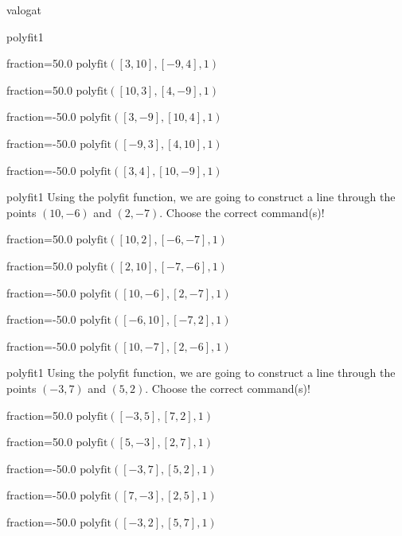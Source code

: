 \documentclass[12pt]{article}
\begin{document}
\begin{quiz}{valogat}
\begin{multi}[multiple]{polyfit1}
\item[fraction=50.0] $\mathrm{polyfit}([3,10], [-9,4], 1)$
\item[fraction=50.0] $\mathrm{polyfit}([10,3], [4,-9], 1)$
\item[fraction=-50.0]  $\mathrm{polyfit}([3,-9], [10,4], 1)$
\item[fraction=-50.0]  $\mathrm{polyfit}([-9,3], [4,10], 1)$
\item[fraction=-50.0]  $\mathrm{polyfit}([3,4], [10,-9], 1)$
\end{multi}
\begin{multi}[multiple]{polyfit1}
Using the polyfit function, we are going to construct a line through the points $\left(10,-6\right)$ and $\left(2,-7\right)$.
Choose the correct command(s)!

\item[fraction=50.0] $\mathrm{polyfit}([10,2], [-6,-7], 1)$
\item[fraction=50.0] $\mathrm{polyfit}([2,10], [-7,-6], 1)$
\item[fraction=-50.0]  $\mathrm{polyfit}([10,-6], [2,-7], 1)$
\item[fraction=-50.0]  $\mathrm{polyfit}([-6,10], [-7,2], 1)$
\item[fraction=-50.0]  $\mathrm{polyfit}([10,-7], [2,-6], 1)$
\end{multi}
\begin{multi}[multiple]{polyfit1}
Using the polyfit function, we are going to construct a line through the points $\left(-3,7\right)$ and $\left(5,2\right)$.
Choose the correct command(s)!

\item[fraction=50.0] $\mathrm{polyfit}([-3,5], [7,2], 1)$
\item[fraction=50.0] $\mathrm{polyfit}([5,-3], [2,7], 1)$
\item[fraction=-50.0]  $\mathrm{polyfit}([-3,7], [5,2], 1)$
\item[fraction=-50.0]  $\mathrm{polyfit}([7,-3], [2,5], 1)$
\item[fraction=-50.0]  $\mathrm{polyfit}([-3,2], [5,7], 1)$
\end{multi}
\end{quiz}
\end{document}
